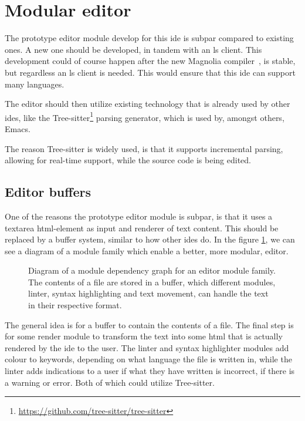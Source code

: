 \section{Modular editor}

The prototype editor module develop for this \gls*{ide} is subpar compared to
existing ones. A new one should be developed, in tandem with an \gls*{ls} client.
This development could of course happen after the new Magnolia compiler~\cite{wiig},
is stable, but regardless an \gls*{ls} client is needed. This would ensure that
this \gls*{ide} can support many languages.

The editor should then utilize existing technology that is already used by other
\gls*{ide}s, like the Tree-sitter\footnote{\url{https://github.com/tree-sitter/tree-sitter}}
parsing generator, which is used by, amongst others, Emacs.

The reason Tree-sitter is widely used, is that it supports incremental parsing,
allowing for real-time support, while the source code is being edited.


\subsection{Editor buffers}

One of the reasons the prototype editor module is subpar, is that it uses a
textarea \gls*{html}-element as input and renderer of text content. This should
be replaced by a buffer system, similar to how other \gls*{ide}s do. In the
figure \ref{fig:editorBuffer}, we can see a diagram of a module family which
enable a better, more modular, editor.

\begin{figure}
  \centering
  
  \caption{
    Diagram of a module dependency graph for an editor module family. The
    contents of a file are stored in a buffer, which different modules, linter,
    syntax highlighting and text movement, can handle the text in their
    respective format.
  }
  \label{fig:editorBuffer}
\end{figure}

The general idea is for a buffer to contain the contents of a file. The final
step is for some render module to transform the text into some \gls*{html} that
is actually rendered by the \gls*{ide} to the user. The linter and syntax
highlighter modules add colour to keywords, depending on what language the file
is written in, while the linter adds indications to a user if what they have
written is incorrect, if there is a warning or error. Both of which could
utilize Tree-sitter.

